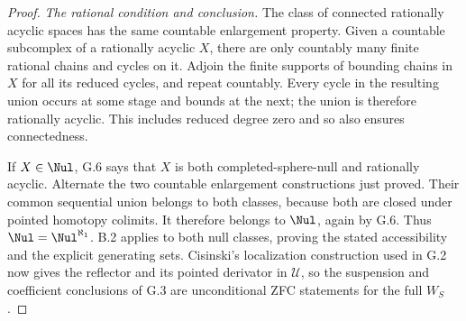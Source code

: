\begin{proof}
\emph{The rational condition and conclusion.}
The class of connected rationally acyclic spaces has the same countable enlargement property. Given a countable subcomplex of a rationally acyclic $X$, there are only countably many finite rational chains and cycles on it. Adjoin the finite supports of bounding chains in $X$ for all its reduced cycles, and repeat countably. Every cycle in the resulting union occurs at some stage and bounds at the next; the union is therefore rationally acyclic. This includes reduced degree zero and so also ensures connectedness.

If $X\in\Nul$, G.6 says that $X$ is both completed-sphere-null and rationally acyclic. Alternate the two countable enlargement constructions just proved. Their common sequential union belongs to both classes, because both are closed under pointed homotopy colimits. It therefore belongs to $\Nul$, again by G.6. Thus $\Nul=\Nul^{\aleph_1}$. B.2 applies to both null classes, proving the stated accessibility and the explicit generating sets. Cisinski's localization construction used in G.2 now gives the reflector and its pointed derivator in $\mathcal U$, so the suspension and coefficient conclusions of G.3 are unconditional ZFC statements for the full $W_S$.
\end{proof}
